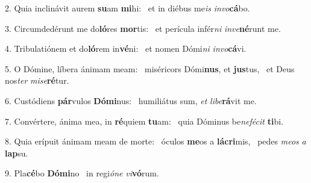 2. Quia inclinávit aurem \textbf{su}am \textbf{mi}hi: \ast\  et in diébus me\textit{is} \textit{in}\textit{vo}\textbf{cá}bo.\

3. Circumdedérunt me do\textbf{ló}res \textbf{mor}tis: \ast\  et perícula infér\textit{ni} \textit{in}\textit{ve}\textbf{né}runt me.\

4. Tribulatiónem et do\textbf{ló}rem in\textbf{vé}ni: \ast\  et nomen Dómi\textit{ni} \textit{in}\textit{vo}\textbf{cá}vi.\

5. O Dómine, líbera ánimam meam: \dag\  miséricors Dómi\textbf{nus}, et \textbf{jus}tus, \ast\  et Deus nos\textit{ter} \textit{mi}\textit{se}\textbf{ré}tur.\

6. Custódiens \textbf{pár}vulos \textbf{Dó}\textbf{mi}nus: \ast\  humiliátus sum, \textit{et} \textit{li}\textit{be}\textbf{rá}vit me.\

7. Convértere, ánima mea, in \textbf{ré}quiem \textbf{tu}am: \ast\  quia Dóminus be\textit{ne}\textit{fé}\textit{cit} \textbf{ti}bi.\

8. Quia erípuit ánimam meam de morte: \dag\  óculos \textbf{me}os a \textbf{lá}\textbf{cri}mis, \ast\  pedes \textit{me}\textit{os} \textit{a} \textbf{lap}su.\

9. Pla\textbf{cé}bo \textbf{Dó}\textbf{mi}no \ast\  in regi\textit{ó}\textit{ne} \textit{vi}\textbf{vó}rum.\

